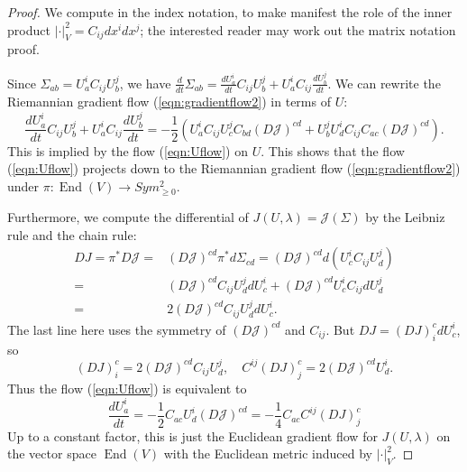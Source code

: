\documentclass[10pt,a4paper]{amsart}
\DeclareMathOperator{\End}{End}
\begin{document}
	\begin{proof}
		We compute in the index notation, to make manifest the role of the inner product $|\cdot|^2_V= C_{ij}dx^idx^j$; the interested reader may work out the matrix notation proof.
		
		
		
		Since $\Sigma_{ab}= U_a^i C_{ij} U_b^j$, we have $\frac{d}{dt}\Sigma_{ab}= \frac{d U_a^i}{dt} C_{ij} U_b^j+ U^i_a C_{ij} \frac{dU_b^j}{dt}$. We can rewrite the Riemannian gradient flow (\ref{eqn:gradientflow2}) in terms of $U$:
		\[
		\frac{d U_a^i}{dt} C_{ij} U_b^j+ U^i_a C_{ij} \frac{dU_b^j}{dt}= - \frac{1}{2} (U_a^i C_{ij} U_c^j C_{bd} (D \mathcal{J})^{cd}   + U_b^j U_d^i C_{ij} C_{ac}  (D \mathcal{J})^{cd}    ).
		\]
		This is implied by the flow (\ref{eqn:Uflow}) on $U$. This shows that the flow (\ref{eqn:Uflow}) projects down to the Riemannian gradient flow (\ref{eqn:gradientflow2}) under $\pi: \End(V)\to Sym^2_{\geq 0}$. 
		
		
		
		
		Furthermore,  we compute the differential of $J(U,\lambda)= \mathcal{J}(\Sigma)$ by the Leibniz rule and the chain rule:
		\[
		\begin{split}
			DJ= \pi^* D\mathcal{J}= & (D\mathcal{J})^{cd} \pi^* d\Sigma_{cd} = (D\mathcal{J})^{cd} d( U_c^i C_{ij} U_d^j  )
			\\
			= &   (D\mathcal{J})^{cd} C_{ij} U_d^j  dU_c^i  + (D\mathcal{J})^{cd} U_c^i C_{ij} dU_d^j 
			\\
			= &  2(D\mathcal{J})^{cd} C_{ij} U_d^j  dU_c^i  .
		\end{split}
		\]
		The last line here uses the symmetry of $(D\mathcal{J})^{cd}$ and $C_{ij}$. But $DJ= (DJ)_i^c dU_c^i$, so
		\[
		(DJ)_i^c = 2(D\mathcal{J})^{cd} C_{ij} U_d^j  ,\quad    C^{ij}(DJ)^c_j= 2(D\mathcal{J})^{cd} U_d^i. 
		\]
		Thus the flow (\ref{eqn:Uflow}) is equivalent to
		\[
		\frac{dU_a^i}{dt}= - \frac{1}{2} C_{ac} U_d^i (D\mathcal{J})^{cd}= - \frac{1}{4} C_{ac} C^{ij} (DJ)^c_j
		\]
		Up to a constant factor, this is just the Euclidean gradient flow for $J(U,\lambda)$ on the vector space $\End(V)$ with the Euclidean metric induced by $|\cdot|_V^2$.
	\end{proof}
\end{document}

